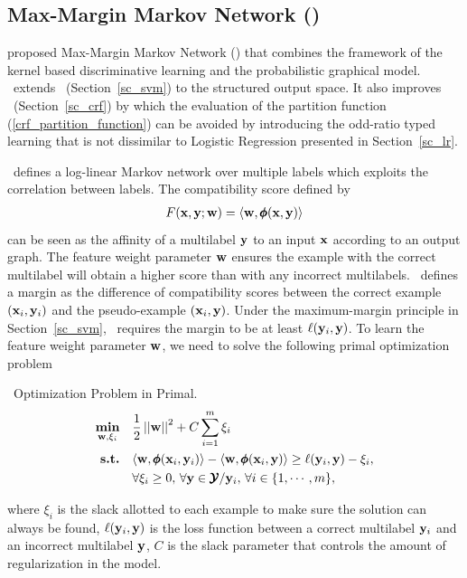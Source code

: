 {%
% 
\subsection{Max-Margin Markov Network (\mmmn)} \label{sc_mmmn}

\citet{Taskar04max} proposed Max-Margin Markov Network (\mmmn) that combines the framework of the kernel based discriminative learning and the probabilistic graphical model.
\mmmn\ extends \svm\ (Section~\ref{sc_svm}) to the structured output space.
It also improves \crf\ (Section~\ref{sc_crf}) by which the evaluation of the partition function (\ref{crf_partition_function}) can be avoided by introducing the odd-ratio typed learning that is not dissimilar to Logistic Regression presented in Section~\ref{sc_lr}.

\mmmn\ defines a log-linear Markov network over multiple labels which exploits the correlation between labels.
The compatibility score defined by 
\begin{align}
	F(\mathbf {x},\mathbf {y};\mathbf {w}) = \langle \mathbf {w}, \pmb \phi(\mathbf {x},\mathbf {y}) \rangle \label{mmmn_score}
\end{align}
can be seen as the affinity of a multilabel $\mathbf {y}$ to an input $\mathbf {x}$ according to an output graph.
The feature weight parameter $\mathbf {w}$ ensures the example with the correct multilabel will obtain a higher score than with any incorrect multilabels.
\mmmn\ defines a margin as the difference of compatibility scores between the correct example $(\mathbf {x}_i,\mathbf {y}_i)$ and the pseudo-example $(\mathbf {x}_i,\mathbf {y})$.
Under the maximum-margin principle in Section~\ref{sc_svm}, \mmmn\ requires the margin to be at least $\mathbf {\ell}(\mathbf {y}_i,{\mathbf {y}})$.
To learn the feature weight parameter $\mathbf {w}$, we need to solve the following primal optimization problem
\begin{definition}{\mmmn\ Optimization Problem in Primal.}\label{def_mmmn}
	\begin{align*}
		\underset{\mathbf {w},\mathbf{\xi}_i}{\textbf{min}} & \quad\frac{1}{2}\left|\left| \mathbf {w} \right|\right|^2 + C\sum_{i=1}^{m}\xi_i \\
		\textbf{s.t.} & \quad\langle \mathbf {w}, \pmb \phi(\mathbf {x}_i,\mathbf {y}_i) \rangle - \langle \mathbf {w}, \pmb \phi(\mathbf {x}_i,\mathbf {y}) \rangle \ge \mathbf {\ell}(\mathbf {y}_i,\mathbf {y})-\xi_i,\\
		& \quad \forall \xi_i\ge0,\, \forall \mathbf {y}\in\pmb {\mathcal{Y}}/\mathbf {y}_i,\, \forall i\in\{1,\cdots,m\},
	\end{align*}
\end{definition}
\noindent
where $\xi_i$ is the slack allotted to each example to make sure the solution can always be found, $\mathbf {\ell}(\mathbf {y}_i,\mathbf {y})$ is the loss function between a correct multilabel $\mathbf {y}_i$ and an incorrect multilabel $\mathbf {y}$, $C$ is the slack parameter that controls the amount of regularization in the model.

}
